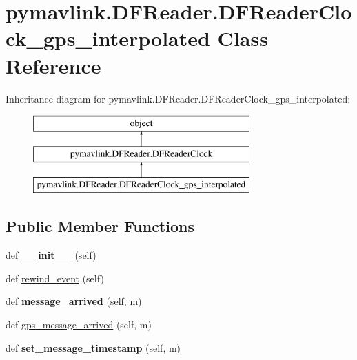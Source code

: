\hypertarget{classpymavlink_1_1DFReader_1_1DFReaderClock__gps__interpolated}{}\section{pymavlink.\+D\+F\+Reader.\+D\+F\+Reader\+Clock\+\_\+gps\+\_\+interpolated Class Reference}
\label{classpymavlink_1_1DFReader_1_1DFReaderClock__gps__interpolated}
Inheritance diagram for pymavlink.\+D\+F\+Reader.\+D\+F\+Reader\+Clock\+\_\+gps\+\_\+interpolated\+:\begin{figure}[H]
\begin{center}
\leavevmode
\includegraphics[height=3.000000cm]{classpymavlink_1_1DFReader_1_1DFReaderClock__gps__interpolated}
\end{center}
\end{figure}
\subsection*{Public Member Functions}
\begin{DoxyCompactItemize}
\item 
\mbox{\label{classpymavlink_1_1DFReader_1_1DFReaderClock__gps__interpolated_a3f055fcf15691808e52dec36a04d2efd}} 
def {\bfseries \+\_\+\+\_\+init\+\_\+\+\_\+} (self)
\item 
def \hyperlink{classpymavlink_1_1DFReader_1_1DFReaderClock__gps__interpolated_a17d0356947948b2bbeb7a47531515c72}{rewind\+\_\+event} (self)
\item 
\mbox{\label{classpymavlink_1_1DFReader_1_1DFReaderClock__gps__interpolated_a299f6e30eda10492ab18a321a09a15fa}} 
def {\bfseries message\+\_\+arrived} (self, m)
\item 
def \hyperlink{classpymavlink_1_1DFReader_1_1DFReaderClock__gps__interpolated_ab5c7d16117c7dc486fcd820a8558ef13}{gps\+\_\+message\+\_\+arrived} (self, m)
\item 
\mbox{\label{classpymavlink_1_1DFReader_1_1DFReaderClock__gps__interpolated_aead72c7143461d54d934f541dbc03e41}} 
def {\bfseries set\+\_\+message\+\_\+timestamp} (self, m)
\end{DoxyCompactItemize}
